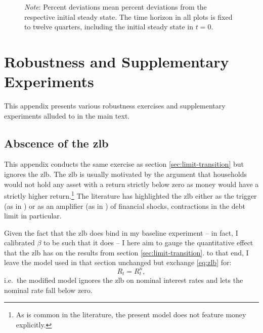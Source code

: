 \documentclass[a4paper,12pt]{article} %
\numberwithin{equation}{section} %
\numberwithin{figure}{section}
\numberwithin{table}{section}
\begin{document}
\begin{refsection}
\begin{appendices}
\begin{figure}[H]
     \vspace{10pt}
     
     \justifying
     \footnotesize
	\textit{Note}: Percent deviations mean percent deviations from the respective initial steady state. The time horizon in all plots is fixed to twelve quarters, including the initial steady state in $t=0$.
\end{figure}

\section{Robustness and Supplementary Experiments}
\label{sec-app:robust}

This appendix presents various robustness exercises and supplementary experiments alluded to in the main text.

\subsection{Abscence of the \Gls{zlb}}
\label{sec-app:robust-no-zlb}

This appendix conducts the same exercise as section \ref{sec:limit-transition} but ignores the \Gls{zlb}. The \Gls{zlb} is usually motivated by the argument that households would not hold any asset with a return strictly below zero as money would have a strictly higher return.\footnote{As is common in the literature, the present model does not feature money explicitly.} The literature has highlighted the \Gls{zlb} either as the trigger (as in \cite{egg2012}) or as an amplifier (as in \cite{gl2017}) of financial shocks, contractions in the debt limit in particular.

Given the fact that the \Gls{zlb} does bind in my baseline experiment -- in fact, I calibrated $\beta$ to be such that it does -- I here aim to gauge the quantitative effect that the \Gls{zlb} has on the results from section \ref{sec:limit-transition}. to that end, I leave the model used in that section unchanged but exchange \eqref{eq:zlb} for:
\begin{equation}
    R_t = R^n_t, \label{eq:no-zlb}
\end{equation}
i.e.~the modified model ignores the \Gls{zlb} on nominal interest rates and lets the nominal rate fall below zero.


\end{appendices}
\end{refsection}
\end{document}
